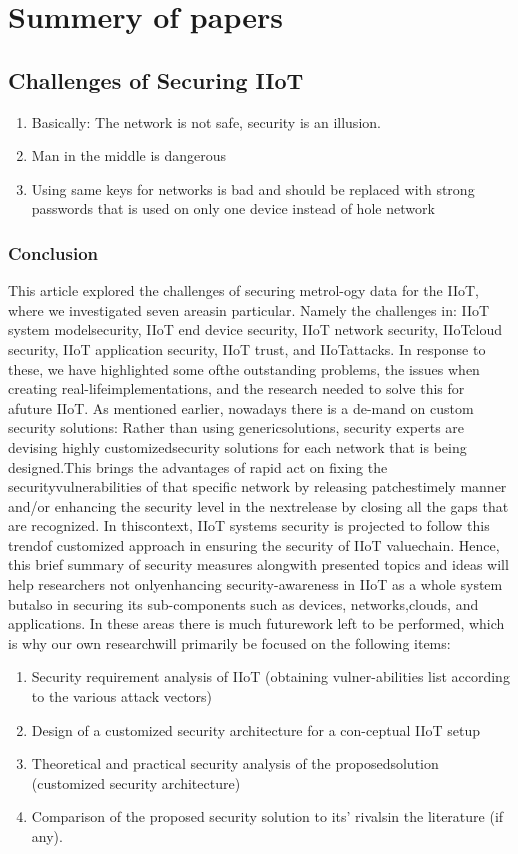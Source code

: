\documentclass[../../../main.tex]{subfiles}
\begin{document}
\section{Summery of papers}
\subsection{Challenges of Securing IIoT}
\begin{enumerate}
    \item Basically: The network is not safe, security is an illusion.
    \item Man in the middle is dangerous
    \item Using same keys for networks is bad and should be replaced with strong passwords that is used on only one device instead of hole network
\end{enumerate}
\subsubsection{Conclusion}
This  article explored  the  challenges  of  securing  metrol-ogy  data  for  the  IIoT,  where  we  investigated  seven  areasin  particular.  Namely  the  challenges  in:  IIoT  system  modelsecurity, IIoT end device security, IIoT network security, IIoTcloud  security,  IIoT  application  security,  IIoT  trust,  and  IIoTattacks.  In  response  to  these,  we  have  highlighted  some  ofthe  outstanding  problems,  the  issues  when  creating  real-lifeimplementations,  and  the  research  needed  to  solve  this  for  afuture  IIoT.  As  mentioned  earlier,  nowadays  there  is  a  de-mand on custom security solutions: Rather than using genericsolutions,  security  experts  are  devising  highly  customizedsecurity  solutions  for  each  network  that  is  being  designed.This brings the advantages of rapid act on fixing the securityvulnerabilities  of  that  specific  network  by  releasing  patchestimely manner and/or enhancing the security level in the nextrelease  by  closing  all  the  gaps  that  are  recognized.  In  thiscontext, IIoT systems security is projected to follow this trendof customized approach in ensuring the security of IIoT valuechain. Hence, this brief summary of security measures alongwith presented topics and ideas will help researchers not onlyenhancing  security-awareness  in  IIoT  as  a  whole  system  butalso in securing its sub-components such as devices, networks,clouds,  and  applications.  In  these  areas  there  is  much  futurework  left  to  be  performed,  which  is  why  our  own  researchwill primarily be focused on the following items:
\begin{enumerate}
    \item Security requirement analysis of IIoT (obtaining vulner-abilities list according to the various attack vectors)
    \item Design  of  a  customized  security  architecture  for  a  con-ceptual IIoT setup
    \item Theoretical and practical security analysis of the proposedsolution (customized security architecture)
    \item Comparison of the proposed security solution to its’ rivalsin the literature (if any).
\end{enumerate}
\end{document}
